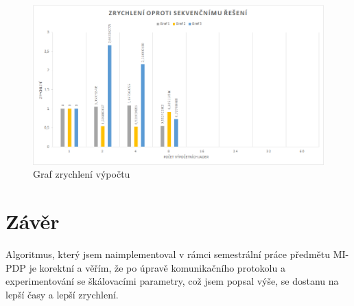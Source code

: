 \documentclass[czech]{article}
\begin{document}
\begin{figure} 
	\centering
	\caption{Graf zrychlení výpočtu}
	\label{speedup-graph}
	\includegraphics[width=\textwidth]{graph/speedup-chart.png}
\end{figure}

\section{Závěr}

Algoritmus, který jsem naimplementoval v rámci semestrální práce předmětu MI-PDP je korektní a věřím, že po úpravě komunikačního protokolu a experimentování se škálovacími parametry, což jsem popsal výše, se dostanu na lepší časy a lepší zrychlení. 

\appendix
\end{document}
